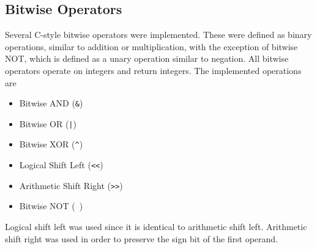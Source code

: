 \documentclass{article}
\begin{document}
\subsection{Bitwise Operators}
Several C-style bitwise operators were implemented. These were defined as binary operations, similar to addition or multiplication, with the exception of bitwise NOT, which is defined as a unary operation similar to negation. All bitwise operators operate on integers and return integers. The implemented operations are
\begin{itemize}
    \item Bitwise AND (\texttt{&})
    \item Bitwise OR (\texttt{|})
    \item Bitwise XOR (\texttt{^})
    \item Logical Shift Left (\texttt{<<})
    \item Arithmetic Shift Right (\texttt{>>})
    \item Bitwise NOT (\texttt{~})
\end{itemize}
Logical shift left was used since it is identical to arithmetic shift left. Arithmetic shift right was used in order to preserve the sign bit of the first operand.
\end{document}
